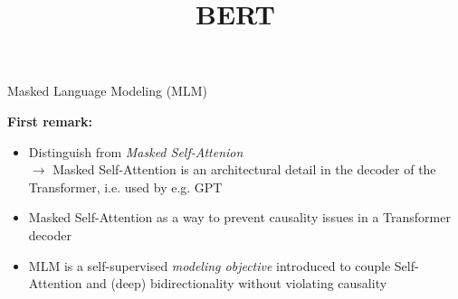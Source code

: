 



\newcommand{\titlefigure}{figure/bert.jpeg}
\newcommand{\learninggoals}{
\item Know the pre-training tasks
\item How to construct samples
\item Understand the pre-training
\item Gain understanding of the fine-tuning procedure
\item Differences between token- and sequence classification}

\title{BERT}
\date{}




\begin{frame}{Masked Language Modeling (MLM)}

\vfill

\textbf{First remark:}

\begin{itemize}
	\item Distinguish from \textit{Masked Self-Attenion}\\ 
				$\to$ Masked Self-Attention is an architectural detail in the decoder of the Transformer, i.e. used by e.g. GPT
	\item Masked Self-Attention as a way to prevent causality issues in a Transformer decoder 
	\item MLM is a self-supervised \textit{modeling objective} introduced to couple Self-Attention and (deep) bidirectionality without violating causality
\end{itemize}

\vfill

\end{frame}


